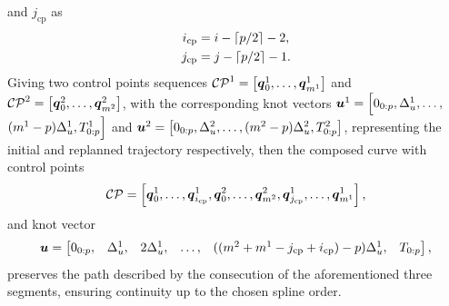 and $j_{\text{cp}}$ as
\begin{equation*}
    \begin{split}
        i_{\text{cp}} & = i - \left \lceil p/2 \right \rceil - 2, \\
        j_{\text{cp}} & = j - \left \lceil p/2 \right \rceil - 1. \\
    \end{split}
\end{equation*}
Giving two control points sequences $\mathcal{CP}^1 = \left[ \boldsymbol{q}^1_0, \dots, \boldsymbol{q}^1_{m^1} \right]$ and
$\mathcal{CP}^2 = \left[ \boldsymbol{q}^2_0, \dots, \boldsymbol{q}^2_{m^2} \right]$, with the corresponding knot vectors
$\boldsymbol{u}^1 = \Big[ 0_{0:p}, \Delta^1_{u}, \dots,$ $(m^1-p)\Delta^1_{u}, T^1_{0:p} \Big]$
and $\boldsymbol{u}^2 = \left[ 0_{0:p}, \Delta^2_{u}, \dots, (m^2-p)\Delta^2_{u}, T^2_{0:p} \right]$,
representing the initial and replanned trajectory respectively, then the composed curve with control points
\begin{equation*}
    \mathcal{CP} = \left[ \boldsymbol{q}^1_0, \dots, \boldsymbol{q}^1_{i_{\text{cp}}}, \boldsymbol{q}^2_0, \dots, \boldsymbol{q}^2_{m^2}, \boldsymbol{q}^1_{j_{\text{cp}}}, \dots, \boldsymbol{q}^1_{m^1} \right],
\end{equation*}
and knot vector
\begin{equation*}
    \boldsymbol{u} =
    \begin{bmatrix}
        0_{0:p}, & \Delta^1_{u}, & 2\Delta^1_{u}, & \dots, & ((m^2 + m^1 - j_{\text{cp}} + i_{\text{cp}}) - p)\Delta^1_{u}, & T_{0:p}
    \end{bmatrix},
\end{equation*}
preserves the path described by the consecution of the aforementioned three segments, ensuring continuity up to the chosen spline order.

